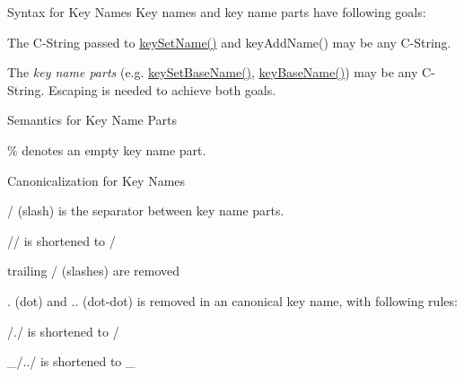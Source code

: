 \begin{DoxyParagraph}{Syntax for Key Names}
Key names and key name parts have following goals\-:
\begin{DoxyItemize}
\item The C-\/\-String passed to \hyperlink{group__keyname_ga7699091610e7f3f43d2949514a4b35d9}{key\-Set\-Name()} and key\-Add\-Name() may be any C-\/\-String.
\item The {\itshape key name parts} (e.\-g. \hyperlink{group__keyname_ga6e804bd453f98c28b0ff51430d1df407}{key\-Set\-Base\-Name()}, \hyperlink{group__keyname_gaaff35e7ca8af5560c47e662ceb9465f5}{key\-Base\-Name()}) may be any C-\/\-String. Escaping is needed to achieve both goals.
\end{DoxyItemize}
\end{DoxyParagraph}
\begin{DoxyParagraph}{Semantics for Key Name Parts}

\begin{DoxyItemize}
\item \% denotes an empty key name part.
\end{DoxyItemize}
\end{DoxyParagraph}
\begin{DoxyParagraph}{Canonicalization for Key Names}

\begin{DoxyItemize}
\item / (slash) is the separator between key name parts.
\item // is shortened to /
\item trailing / (slashes) are removed
\item . (dot) and .. (dot-\/dot) is removed in an canonical key name, with following rules\-:
\begin{DoxyItemize}
\item /./ is shortened to /
\item \-\_\-/../ is shortened to \-\_\-
\end{DoxyItemize}
\end{DoxyItemize}
\end{DoxyParagraph}

